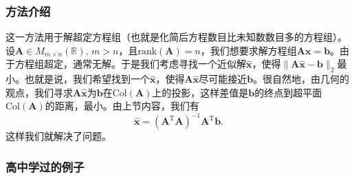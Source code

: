 \documentclass[a4paper, 12pt]{article}
\begin{document}
    \subsubsection{方法介绍}

    这一方法用于解超定方程组（也就是化简后方程数目比未知数数目多的方程组）。设$\boldsymbol A\in M_{m\times n}(\mathbb R),\,m>n$，且$\mathrm{rank}(\boldsymbol A)=n$，我们想要求解方程组$\boldsymbol A\boldsymbol x=\boldsymbol b$。由于方程组超定，通常无解。于是我们考虑寻找一个近似解$\boldsymbol{\hat x}$，使得$\|\boldsymbol A\boldsymbol{\hat x}-\boldsymbol b\|_2$最小。也就是说，我们希望找到一个$\boldsymbol{\hat x}$，使得$\boldsymbol A\boldsymbol{\hat x}$尽可能接近$\boldsymbol b$。很自然地，由几何的观点，我们寻求$\boldsymbol A\boldsymbol{\hat x}$为$\boldsymbol b$在$\mathrm{Col}(\boldsymbol A)$上的投影，这样差值是$\boldsymbol b$的终点到超平面$\mathrm{Col}(\boldsymbol A)$的距离，最小。由上节内容，我们有
    \[
    \boldsymbol{\hat x}=(\boldsymbol A^\mathrm T\boldsymbol A)^{-1}\boldsymbol A^\mathrm T\boldsymbol b.
    \]
    这样我们就解决了问题。

    \subsubsection{高中学过的例子}
\end{document}
